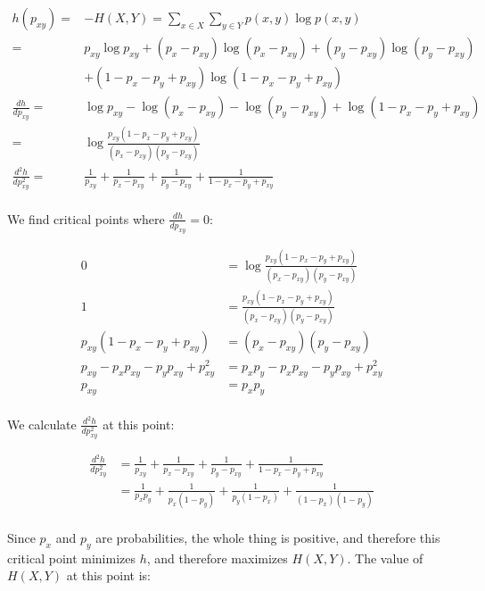 \documentclass[fleqn]{homework}
\begin{document}
\begin{problem}{3}
    \begin{align*}
      h(p_{xy}) =& -H(X,Y) = \sum_{x \in X} \sum_{y \in Y} p(x,y) \log p(x,y) \\
                =& p_{xy} \log p_{xy} + (p_x - p_{xy}) \log (p_x - p_{xy}) + (p_y - p_{xy}) \log (p_y - p_{xy})\\
                 &+ (1 - p_x - p_y + p_{xy}) \log (1 - p_x - p_y + p_{xy})\\
      \frac{dh}{dp_{xy}} =& \log p_{xy} - \log (p_x - p_{xy}) - \log (p_y - p_{xy}) + \log (1 - p_x - p_y + p_{xy}) \\
      =& \log \frac{p_{xy}(1-p_x-p_y+p_{xy})}{(p_x - p_{xy})(p_y-p_{xy})}\\
      \frac{d^2h}{dp_{xy}^2} =& \frac{1}{p_{xy}} + \frac{1}{p_x-p_{xy}} + \frac{1}{p_y-p_{xy}} + \frac{1}{1 - p_x - p_y + p_{xy}} \\
    \end{align*}

    We find critical points where $\frac{dh}{dp_{xy}}=0$:

    \begin{align*}
      0 &= \log \frac{p_{xy}(1-p_x-p_y+p_{xy})}{(p_x - p_{xy})(p_y-p_{xy})} \\
      1 &= \frac{p_{xy}(1-p_x-p_y+p_{xy})}{(p_x - p_{xy})(p_y-p_{xy})} \\
      p_{xy}(1-p_x-p_y+p_{xy}) &= (p_x - p_{xy})(p_y-p_{xy}) \\
      p_{xy} - p_x p_{xy} - p_y p_{xy} + p_{xy}^2 &= p_x p_y - p_x p_{xy} - p_y p_{xy} + p_{xy}^2 \\
      p_{xy} &= p_x p_y \\
    \end{align*}

    We calculate $\frac{d^2h}{dp_{xy}^2}$ at this point:

    \begin{align*}
      \frac{d^2h}{dp_{xy}^2} &= \frac{1}{p_{xy}} + \frac{1}{p_x-p_{xy}} + \frac{1}{p_y-p_{xy}} + \frac{1}{1 - p_x - p_y + p_{xy}} \\
      &= \frac{1}{p_{x}p_{y}} + \frac{1}{p_x(1-p_y)} + \frac{1}{p_y(1-p_x)} + \frac{1}{(1 - p_x)(1 - p_y)} \\
    \end{align*}

    Since $p_x$ and $p_y$ are probabilities, the whole thing is positive, and
    therefore this critical point minimizes $h$, and therefore maximizes
    $H(X,Y)$.  The value of $H(X,Y)$ at this point is:


\end{problem}
\end{document}
